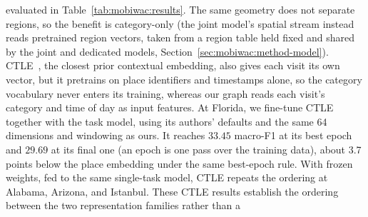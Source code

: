 evaluated in Table~\ref{tab:mobiwac:results}. The same geometry does not separate regions, so the benefit is category-only (the joint model's spatial stream instead reads pretrained region vectors, taken from a region table held fixed and shared by the joint and dedicated models, Section~\ref{sec:mobiwac:method-model}).
CTLE~\cite{lin2021ctle}, the closest prior contextual embedding, also gives each visit its own vector, but it pretrains on place identifiers and timestamps alone, so the category vocabulary never enters its training, whereas our graph reads each visit's category and time of day as input features. At Florida, we fine-tune CTLE together with the task model, using its authors' defaults and the same 64 dimensions and windowing as ours. It reaches $33.45$ macro-F1 at its best epoch and $29.69$ at its final one (an epoch is one pass over the training data), about 3.7 points below the place embedding under the same best-epoch rule. With frozen weights, fed to the same single-task model, CTLE repeats the ordering at Alabama, Arizona, and Istanbul. These CTLE results establish the ordering between the two representation families rather than a

